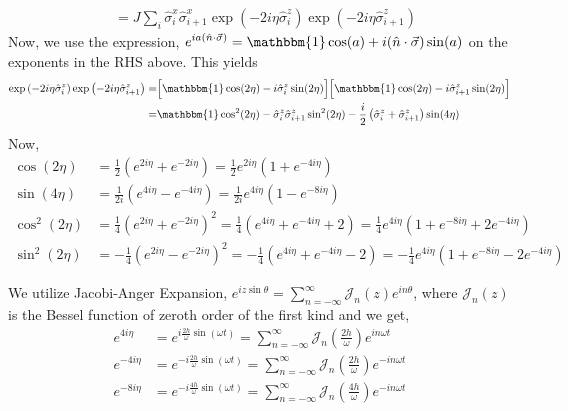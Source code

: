 \documentclass[aps,prb,reprint,showpacs,floatfix,superscriptaddress, onecolumn, nofootinbib, 9pt]{revtex4-2}
\begin{document}
\begin{enumerate}
{\begin{align}
				&= J\sum_{i} \hat{\sigma}_{i}^{x} \hat{\sigma}_{i+1}^{x}\exp(-2i\eta\hat{\sigma}^z_i)\exp(-2i\eta\hat{\sigma}^z_{i+1})
				\label{eq:hmov}
			\end{align}
			Now, we use the expression, $\displaystyle e^{ia(\hat{n}\cdot \vec{\sigma})} = \mathbbm{1} \cos(a) + i (\hat{n}\cdot \vec{\sigma})\sin(a)$ on the exponents in the RHS above. This yields
			\begin{align}
				\exp\left(-2i\eta\hat{\sigma}^z_i\right)\exp\left(-2i\eta\hat{\sigma}^z_{i+1}\right)
				=& \Big[\mathbbm{1} \cos(2\eta) - i \hat{\sigma}^z_i\sin(2\eta)\Big]\Big[\mathbbm{1} \cos(2\eta) - i \hat{\sigma}^z_{i+1}\sin(2\eta)\Big]\nonumber\\
				=& \mathbbm{1} \cos^2(2\eta) - \hat{\sigma}^z_i\hat{\sigma}^z_{i+1}\sin^2(2\eta) -\frac{i}{2} \left(\hat{\sigma}^z_i+ \hat{\sigma}^z_{i+1}\right)\sin(4\eta)
				\label{eq:op}
			\end{align}
			Now, 
			\begin{align}
			\cos(2\eta) &= \frac{1}{2}\left(e^{2i\eta} + e^{-2i\eta}\right)= \frac{1}{2}e^{2i\eta}\left(1 + e^{-4i\eta}\right)\nonumber\\
			\sin(4\eta) &= \frac{1}{2i}\left(e^{4i\eta} - e^{-4i\eta}\right)= \frac{1}{2i}e^{4 i\eta}\left(1 - e^{-8i\eta}\right)\nonumber\\
			\cos^2(2\eta) &= \frac{1}{4}\left(e^{2i\eta} + e^{-2i\eta}\right)^2= \frac{1}{4}\left(e^{4i\eta} +e^{-4i\eta} +2\right) = \frac{1}{4}e^{4i\eta}\left(1 +e^{-8i\eta} +2 e^{-4i\eta}\right)\nonumber\\
			\sin^2(2\eta) &= -\frac{1}{4}\left(e^{2i\eta} - e^{-2i\eta}\right)^2= -\frac{1}{4}\left(e^{4i\eta} +e^{-4i\eta} -2\right) = -\frac{1}{4}e^{4i\eta}\left(1 +e^{-8i\eta} -2 e^{-4i\eta}\right)
			\label{eq:terms}
			\end{align}
			
			We utilize Jacobi-Anger Expansion, $\displaystyle e^{iz\sin\theta}=\sum_{n=-\infty}^{\infty} \mathcal{J}_n(z) e^{in\theta}$, where $\mathcal{J}_n(z)$ is the Bessel function of zeroth order of the first kind\cite{das_exotic_2010} and we get,
			\begin{align}
			e^{4i\eta} &= e^{i \frac{2h}{\omega}\sin(\omega t)} = \sum_{n=-\infty}^{\infty} \mathcal{J}_n\left(\frac{2h}{\omega}\right) e^{in\omega t}\nonumber\\
			e^{-4i\eta} &= e^{-i \frac{2h}{\omega}\sin(\omega t)} = \sum_{n=-\infty}^{\infty} \mathcal{J}_n\left(\frac{2h}{\omega}\right) e^{-in\omega t}\nonumber\\
			e^{-8i\eta} &= e^{-i \frac{4h}{\omega}\sin(\omega t)} = \sum_{n=-\infty}^{\infty} \mathcal{J}_n\left(\frac{4h}{\omega}\right) e^{-in\omega t}
			\label{eq:jacAng}
			\end{align}
		
}
\end{enumerate}
\end{document}
